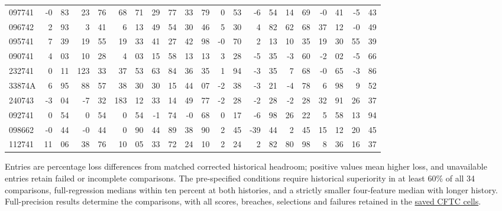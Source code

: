 \documentclass[12pt,a4paper]{article}
\begin{document}
\begin{table}[p]
{\begin{tabular}{l*{10}{r@{.}l}}
097741 & -0 & 83 & 23 & 76 & 68 & 71 & 29 & 77 & 33 & 79 & 0 & 53 & -6 & 54 & 14 & 69 & -0 & 41 & -5 & 43 \\
096742 & 2 & 93 & 3 & 41 & 6 & 13 & 49 & 54 & 30 & 46 & 5 & 30 & 4 & 82 & 62 & 68 & 37 & 12 & -0 & 49 \\
095741 & 7 & 39 & 19 & 55 & 19 & 33 & 41 & 27 & 42 & 98 & -0 & 70 & 2 & 13 & 10 & 35 & 19 & 30 & 55 & 39 \\
090741 & 4 & 03 & 10 & 28 & 4 & 03 & 15 & 58 & 13 & 13 & 3 & 28 & -5 & 35 & -3 & 60 & -2 & 02 & -5 & 66 \\
232741 & 0 & 11 & 123 & 33 & 37 & 53 & 63 & 84 & 36 & 35 & 1 & 94 & -3 & 35 & 7 & 68 & -0 & 65 & -3 & 86 \\
33874A & 6 & 95 & 88 & 57 & 38 & 30 & 30 & 15 & 44 & 07 & -2 & 38 & -3 & 21 & -4 & 78 & 6 & 98 & 9 & 52 \\
240743 & -3 & 04 & -7 & 32 & 183 & 12 & 33 & 14 & 49 & 77 & -2 & 28 & -2 & 28 & -2 & 28 & 32 & 91 & 26 & 37 \\
092741 & 0 & 54 & 0 & 54 & 0 & 54 & -1 & 74 & -0 & 68 & 0 & 17 & -6 & 98 & 26 & 22 & 5 & 58 & 13 & 94 \\
098662 & -0 & 44 & -0 & 44 & 0 & 90 & 44 & 89 & 38 & 90 & 2 & 45 & -39 & 44 & 2 & 45 & 15 & 12 & 20 & 45 \\
112741 & 11 & 06 & 38 & 76 & 10 & 05 & 33 & 72 & 24 & 10 & 2 & 24 & 2 & 82 & 80 & 98 & 8 & 36 & 16 & 37 \\
\bottomrule\end{tabular}}
\par\vspace{2pt}\begin{minipage}{.98\linewidth}\footnotesize
Entries are percentage loss differences from matched corrected historical headroom; positive values mean higher loss, and unavailable entries retain failed or incomplete comparisons.
The pre-specified conditions require historical superiority in at least 60\% of all 34 comparisons, full-regression medians within ten percent at both histories, and a strictly smaller four-feature median with longer history.
Full-precision results determine the comparisons, with all scores, breaches, selections and failures retained in the \href{https://github.com/ByronLi0207/financial-mathematics-paper-20261020/blob/submission-final/results/v10/cftc/cells.csv}{saved CFTC cells}.
\end{minipage}\end{table}
\clearpage
\end{document}
